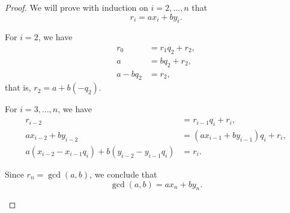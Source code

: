 \begin{proof}
  We will prove with induction on \( i = 2, \ldots, n \) that
  \begin{equation*}
    r_i = ax_i + by_i.
  \end{equation*}

  \begin{algenum}
     For \( i = 2 \), we have
    \begin{align*}
      r_0 &= r_1 q_2 + r_2, \\
      a &= b q_2 + r_2, \\
      a - b q_2 &= r_2,
    \end{align*}
    that is, \( r_2 = a + b (-q_2) \).

     For \( i = 3, \ldots, n \), we have
    \begin{align*}
      r_{i-2} &= r_{i-1} q_i + r_i, \\
      a x_{i-2} + b y_{i-2} &= (a x_{i-1} + b y_{i-1}) q_i + r_i, \\
      a (x_{i-2} - x_{i-1} q_i) + b (y_{i-2} - y_{i-1} q_i) &= r_i.
    \end{align*}

     Since \( r_n = \gcd(a, b) \), we conclude that
    \begin{equation*}
      \gcd(a, b) = a x_n + b y_n.
    \end{equation*}
  \end{algenum}
\end{proof}
